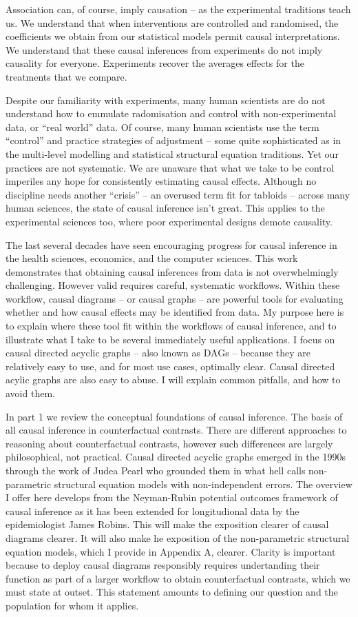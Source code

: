 \documentclass[
  single column]{article}
\begin{document}
Association can, of course, imply causation -- as the experimental
traditions teach us. We understand that when interventions are
controlled and randomised, the coefficients we obtain from our
statistical models permit causal interpretations. We understand that
these causal inferences from experiments do not imply causality for
everyone. Experiments recover the averages effects for the treatments
that we compare.

Despite our familiarity with experiments, many human scientists are do
not understand how to emmulate radomisation and control with
non-experimental data, or ``real world'' data. Of course, many human
scientists use the term ``control'' and practice strategies of
adjustment -- some quite sophisticated as in the multi-level modelling
and statistical structural equation traditions. Yet our practices are
not systematic. We are unaware that what we take to be control imperiles
any hope for consistently estimating causal effects. Although no
discipline needs another ``crisis'' -- an overused term fit for tabloids
-- across many human sciences, the state of causal inference isn't
great. This applies to the experimental sciences too, where poor
experimental designs demote causality.

The last several decades have seen encouraging progress for causal
inference in the health sciences, economics, and the computer sciences.
This work demonstrates that obtaining causal inferences from data is not
overwhelmingly challenging. However valid requires careful, systematic
workflows. Within these workflow, causal diagrams -- or causal graphs --
are powerful tools for evaluating whether and how causal effects may be
identified from data. My purpose here is to explain where these tool fit
within the workflows of causal inference, and to illustrate what I take
to be several immediately useful applications. I focus on causal
directed acyclic graphs -- also known as DAGs -- because they are
relatively easy to use, and for most use cases, optimally clear. Causal
directed acylic graphs are also easy to abuse. I will explain common
pitfalls, and how to avoid them.

In part 1 we review the conceptual foundations of causal inference. The
basis of all causal inference in counterfactual contrasts. There are
different approaches to reasoning about counterfactual contrasts,
however such differences are largely philosophical, not practical.
Causal directed acyclic graphs emerged in the 1990s through the work of
Judea Pearl who grounded them in what hell calls non-parametric
structural equation models with non-independent errors. The overview I
offer here develops from the Neyman-Rubin potential outcomes framework
of causal inference as it has been extended for longitudional data by
the epidemiologist James Robins. This will make the exposition clearer
of causal diagrams clearer. It will also make he exposition of the
non-parametric structural equation models, which I provide in Appendix
A, clearer. Clarity is important because to deploy causal diagrams
responsibly requires undertanding their function as part of a larger
workflow to obtain counterfactual contrasts, which we must state at
outset. This statement amounts to defining our question and the
population for whom it applies.
\end{document}
